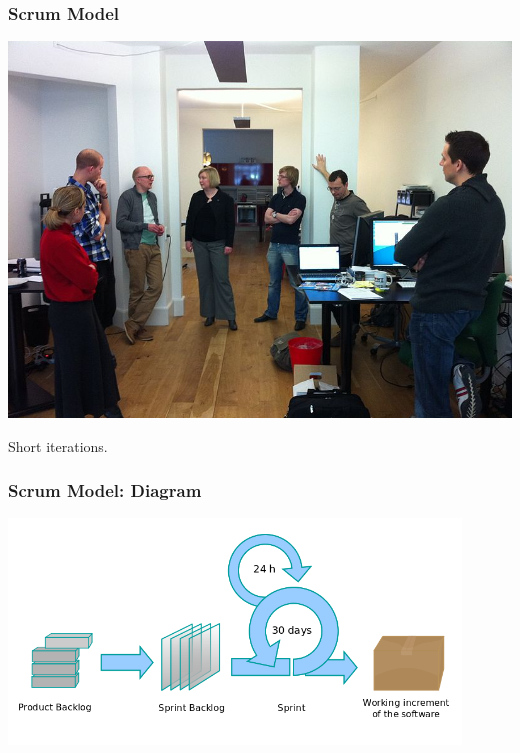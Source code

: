 \begin{frame}
\frametitle{Scrum Model}

\begin{center}
\includegraphics[height=.7\textheight]{images/sprint-meeting.jpg}
\end{center}

Short iterations.

\end{frame}


\begin{frame}
\frametitle{Scrum Model: Diagram}
\begin{center}
\includegraphics[width=0.9\textwidth]{images/scrum.png}
\end{center}

\end{frame}

